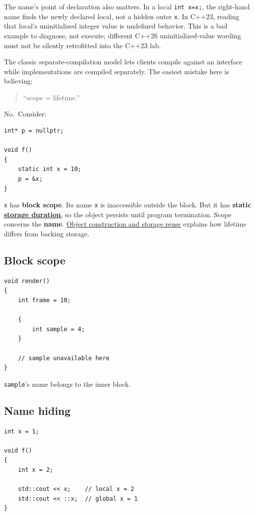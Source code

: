 The name's point of declaration also matters. In a local \texttt{int\ x=x;}, the right-hand name finds the newly declared local, not a hidden outer \texttt{x}. In C++23, reading that local's uninitialized integer value is undefined behavior. This is a bad example to diagnose, not execute; different C++26 uninitialized-value wording must not be silently retrofitted into the C++23 lab.

The classic separate-compilation model lets clients compile against an interface while implementations are compiled separately. The easiest mistake here is believing:

\begin{quote}
``scope = lifetime.''
\end{quote}

No.~Consider:

\begin{verbatim}
int* p = nullptr;

void f()
{
    static int x = 10;
    p = &x;
}
\end{verbatim}

\texttt{x} has \textbf{block scope}. Its name \texttt{x} is inaccessible outside the block. But it has \textbf{static \hyperref[appendix-0b104bcba06b]{storage duration}}, so the object persists until program termination. Scope concerns the \textbf{name}. \hyperref[appendix-a82f9c438857]{Object construction and storage reuse} explains how lifetime differs from backing storage.

\subsection{Block scope}\label{05-engine-i-ch002-block-scope}

\begin{verbatim}
void render()
{
    int frame = 10;

    {
        int sample = 4;
    }

    // sample unavailable here
}
\end{verbatim}

\texttt{sample}'s name belongs to the inner block.

\subsection{Name hiding}\label{05-engine-i-ch002-name-hiding}

\begin{verbatim}
int x = 1;

void f()
{
    int x = 2;

    std::cout << x;    // local x = 2
    std::cout << ::x;  // global x = 1
}
\end{verbatim}

